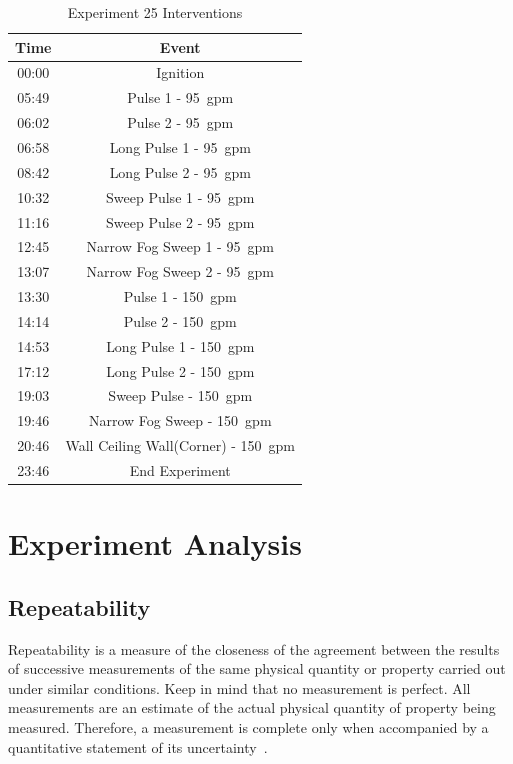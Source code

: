 \documentclass[12pt,oneside]{book}
\begin{document}
\begin{table}[H]
	\centering
	\caption{Experiment 25 Interventions}
	\begin{tabular}{|c|c|} 
		\hline
		Time & 	Event \\ \hline \hline
		00:00 &	Ignition \\ \hline
		05:49 &	Pulse 1 - 95~gpm \\ \hline
		06:02 &	Pulse 2 -  95~gpm \\ \hline
		06:58 &	Long Pulse 1 - 95~gpm \\ \hline
		08:42 &	Long Pulse 2 - 95~gpm \\ \hline
		10:32 &	Sweep Pulse 1 - 95~gpm \\ \hline
		11:16 &	Sweep Pulse 2 - 95~gpm \\ \hline
		12:45 &	Narrow Fog Sweep 1 - 95~gpm \\ \hline
		13:07 &	Narrow Fog Sweep 2 - 95~gpm \\ \hline
		13:30 &	Pulse 1 - 150~gpm \\ \hline
		14:14 &	Pulse 2 - 150~gpm \\ \hline
		14:53 &	Long Pulse 1 - 150~gpm \\ \hline
		17:12 &	Long Pulse 2 - 150~gpm \\ \hline
		19:03 &	Sweep Pulse  - 150~gpm \\ \hline
		19:46 &	Narrow Fog Sweep  - 150~gpm \\ \hline
		20:46 &	Wall Ceiling Wall(Corner) - 150~gpm \\ \hline
		23:46 &	End Experiment \\ \hline
	\end{tabular}
	\label{Table:Exp25Interventions}
\end{table}

\chapter{Experiment Analysis}

\section{Repeatability}

Repeatability is a measure of the closeness of the agreement between the results of successive measurements of the same physical quantity or property carried out under similar conditions. Keep in mind that no measurement is perfect.  All measurements are an estimate of the actual physical quantity of property being measured. Therefore, a measurement is complete only when accompanied by a quantitative statement of its uncertainty~\cite{Taylor&Kuyatt:1994}. 
\end{document}

